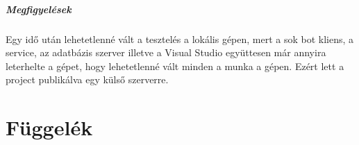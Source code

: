 \documentclass[twoside, a4paper, 12pt]{article}
\begin{document}
\subsubsection{Megfigyelések}
Egy idő után lehetetlenné vált a tesztelés a lokális gépen, mert a sok bot kliens, a service, az adatbázis szerver illetve a Visual Studio együttesen már annyira leterhelte a gépet, hogy lehetetlenné vált minden a munka a gépen. Ezért lett a project publikálva egy külső szerverre.

















































































\newpage
\part{Függelék}
\end{document}
